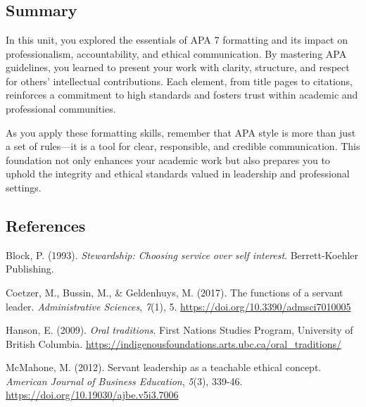 \documentclass[
  letterpaper,
  DIV=11,
  numbers=noendperiod]{scrreprt}
\begin{document}

\chapter*{}\label{section-14}

\markboth{}{}

\section*{Summary}\label{summary-6}


In this unit, you explored the essentials of APA 7 formatting and its
impact on professionalism, accountability, and ethical communication. By
mastering APA guidelines, you learned to present your work with clarity,
structure, and respect for others' intellectual contributions. Each
element, from title pages to citations, reinforces a commitment to high
standards and fosters trust within academic and professional
communities.

As you apply these formatting skills, remember that APA style is more
than just a set of rules---it is a tool for clear, responsible, and
credible communication. This foundation not only enhances your academic
work but also prepares you to uphold the integrity and ethical standards
valued in leadership and professional settings.

\section*{References}\label{references-7}


Block, P. (1993). \emph{Stewardship: Choosing service over self
interest}. Berrett-Koehler Publishing.

Coetzer, M., Bussin, M., \& Geldenhuys, M. (2017). The functions of a
servant leader. \emph{Administrative Sciences}, \emph{7}(1), 5.
\url{https://doi.org/10.3390/admsci7010005}

Hanson, E. (2009). \emph{Oral traditions}. First Nations Studies
Program, University of British Columbia.
\url{https://indigenousfoundations.arts.ubc.ca/oral_traditions/}

McMahone, M. (2012). Servant leadership as a teachable ethical concept.
\emph{American Journal of Business Education}, \emph{5}(3), 339-46.
\url{https://doi.org/10.19030/ajbe.v5i3.7006}
\end{document}
